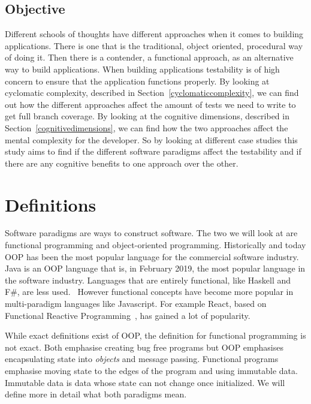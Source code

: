 \documentclass[12pt]{report}
\theoremstyle{definition}
\theoremstyle{theorem}
\begin{document}
\section{Objective}

Different schools of thoughts have different approaches when it comes to
building applications. There is one that is the traditional, object oriented,
procedural way of doing it. Then there is a contender, a functional approach, as
an alternative way to build applications. When building applications testability
is of high concern to ensure that the application functions properly. By looking
at cyclomatic complexity, described in Section~\ref{cyclomaticcomplexity}, we
can find out how the different approaches affect the amount of tests we need to
write to get full branch coverage. By looking at the cognitive dimensions,
described in Section~\ref{cognitivedimensions}, we can find how the two
approaches affect the mental complexity for the developer. So by looking at
different case studies this study aims to find if the different software
paradigms affect the testability and if there are any cognitive benefits to one
approach over the other. 

\chapter{Definitions}\label{theory}

Software paradigms are ways to construct software. The two we will look at are
functional programming and object-oriented programming. Historically and today
OOP has been the most popular language for the commercial software industry.
Java is an OOP language that is, in February 2019, the most popular language in
the software industry. Languages that are entirely functional, like Haskell and
F\#, are less used.~\cite{tiobe} However functional concepts have become more
popular in multi-paradigm languages like Javascript. For example React, based on
Functional Reactive Programming~\cite{reactisfrp}, has gained a lot of
popularity.~\cite{popularityreact} 

While exact definitions exist of OOP, the definition for functional programming
is not exact. Both emphasise creating bug free programs but OOP emphasises
encapsulating state into \textit{objects} and message passing. Functional
programs emphasise moving state to the edges of the program and using immutable
data. Immutable data is data whose state can not change once initialized. We
will define more in detail what both paradigms mean.
\end{document}
